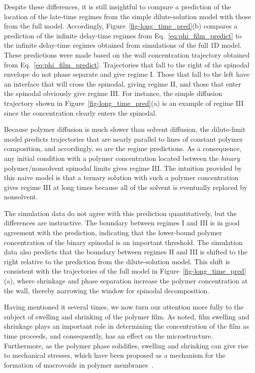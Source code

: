\documentclass[journal=mamobx, layout=twocolumn]{achemso}
\begin{document}
Despite these differences, it is still insightful to compare a prediction of the location of the late-time regimes from the simple dilute-solution model with those from the full model.
Accordingly, Figure~\ref{fig-long_time_pred}(b) compares a prediction of the infinite delay-time regimes from Eq.~\ref{eq:phi_film_predict} to the infinite delay-time regimes obtained from simulations of the full 1D model.
These predictions were made based on the wall concentration trajectory obtained from Eq.~\ref{eq:phi_film_predict}.
Trajectories that fall to the right of the spinodal envelope do not phase separate and give regime I. 
Those that fall to the left have an interface that will cross the spinodal, giving regime II, and those that enter the spinodal obviously give regime III.
For instance, the simple diffusion trajectory shown in Figure~\ref{fig-long_time_pred}(a) is an example of regime III since the concentration clearly enters the spinodal.

Because polymer diffusion is much slower than solvent diffusion, the dilute-limit model predicts trajectories that are nearly parallel to lines of constant polymer composition, and accordingly, so are the regime predictions.
As a consequence, any initial condition with a polymer concentration located between the \emph{binary} polymer/nonsolvent spinodal limits gives regime III.
The intuition provided by this naive model is that a ternary solution with such a polymer concentration gives regime III at long times because all of the solvent is eventually replaced by nonsolvent.

The simulation data do not agree with this prediction quantitatively, but the differences are instructive.
The boundary between regimes I and III is in good agreement with the prediction, indicating that the lower-bound polymer concentration of the binary spinodal is an important threshold.
The simulation data also predicts that the boundary between regimes II and III is shifted to the right relative to the prediction from the dilute-solution model.
This shift is consistent with the trajectories of the full model in Figure~\ref{fig-long_time_pred}(a), where shrinkage and phase separation increase the polymer concentration at the wall, thereby narrowing the window for spinodal decomposition.

Having mentioned it several times, we now turn our attention more fully to the subject of swelling and shrinking of the polymer film.
As noted, film swelling and shrinkage plays an important role in determining the concentration of the film as time proceeds, and consequently, has an effect on the microstructure.
Furthermore, as the polymer phase solidifies, swelling and shrinking can give rise to mechanical stresses, which have been proposed as a mechanism for the formation of macrovoids in polymer membranes~\cite{Prakash2008}.
\end{document}
